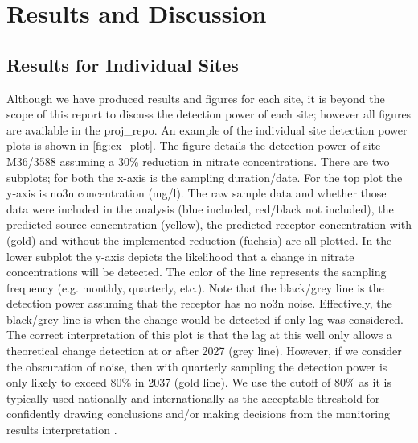 
\section[Results and Discussion]{Results and Discussion} \label{sec:results}

\subsection[Site Results]{Results for Individual Sites} \label{sec:site_results}

Although we have produced results and figures for each site, it is beyond the scope of this report to discuss the detection power of each site; however all figures are available in the \gls{proj_repo}.
An example of the individual site detection power plots is shown in \autoref{fig:ex_plot}.
The figure details the detection power of site M36/3588 assuming a 30\% reduction in nitrate concentrations.
There are two subplots; for both the x-axis is the sampling duration/date.
For the top plot the y-axis is \gls{no3n} concentration (mg/l).
The raw sample data and whether those data were included in the analysis (blue included, red/black not included), the predicted source concentration (yellow), the predicted receptor concentration with (gold) and without the implemented reduction (fuchsia) are all plotted.
In the lower subplot the y-axis depicts the likelihood that a change in nitrate concentrations will be detected.
The color of the line represents the sampling frequency (e.g. monthly, quarterly, etc.).
Note that the black/grey line is the detection power assuming that the receptor has no \gls{no3n} noise.
Effectively, the black/grey line is when the change would be detected if only lag was considered.
The correct interpretation of this plot is that the lag at this well only allows a theoretical change detection at or after 2027 (grey line).
However, if we consider the obscuration of noise, then with quarterly sampling the detection power is only likely to exceed 80\% in 2037 (gold line).
We use the cutoff of 80\% as it is typically used nationally and internationally as the acceptable threshold for confidently drawing conclusions and/or making decisions from the monitoring results interpretation \citep{dumont_determining_nodate}.


